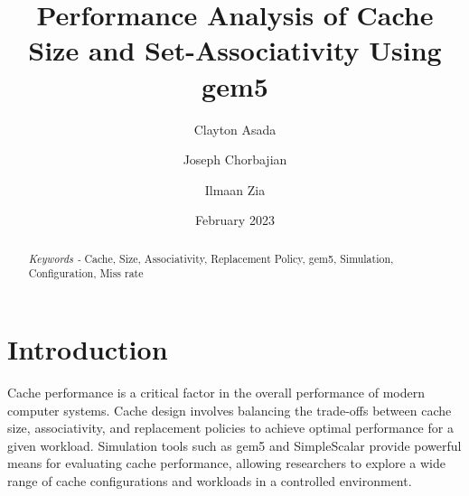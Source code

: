 \documentclass[conference]{IEEEtran}
\begin{document}
\title{Performance Analysis of Cache Size and Set-Associativity Using gem5}

\author[1]{Clayton Asada}
\author[2]{Joseph Chorbajian}
\author[3]{Ilmaan Zia}


\date{February 2023}



\maketitle



\begin{abstract}

\emph{Keywords - } Cache, Size, Associativity, Replacement Policy, gem5, Simulation, Configuration, Miss rate
\end{abstract}



\section{Introduction}
Cache performance is a critical factor in the overall performance of modern computer systems. Cache design involves balancing the trade-offs between cache size, associativity, and replacement policies to achieve optimal performance for a given workload. Simulation tools such as gem5 and SimpleScalar provide powerful means for evaluating cache performance, allowing researchers to explore a wide range of cache configurations and workloads in a controlled environment.
\end{document}
